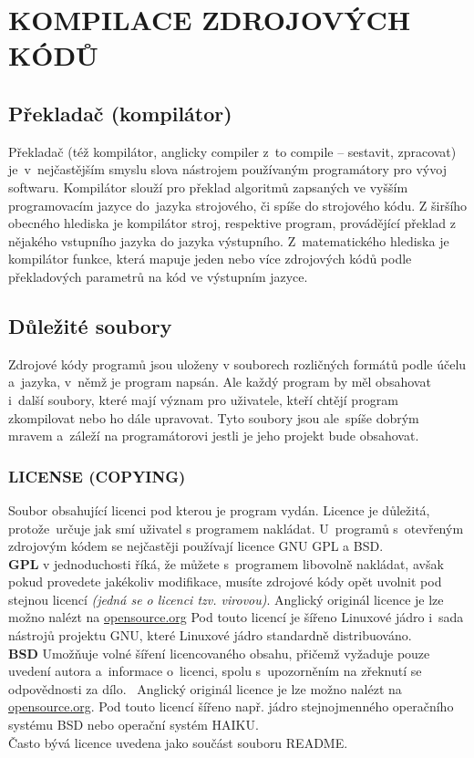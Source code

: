 \documentclass[a4paper,12pt]{article}
\newcommand{\upc}[1]{\uppercase{#1}} %
\renewcommand{\b}[1]{\textbf{#1}} %
\renewcommand{\it}[1]{\textit{#1}}		%
\begin{document}
\section{\upc{Kompilace zdrojových kódů}}
\subsection{Překladač (kompilátor)}
Překladač (též kompilátor, anglicky compiler z~to compile – sestavit, zpracovat) je~v~nejčastějším smyslu slova nástrojem používaným programátory pro vývoj softwaru. Kompilátor slouží pro překlad algoritmů zapsaných ve vyšším programovacím jazyce do~jazyka strojového, či spíše do strojového kódu. Z širšího obecného hlediska je kompilátor stroj, respektive program, provádějící překlad z nějakého vstupního jazyka do jazyka výstupního. Z~matematického hlediska je kompilátor funkce, která mapuje jeden nebo více zdrojových kódů podle překladových parametrů na kód ve výstupním jazyce.~\cite{Wkom}
\subsection{Důležité soubory}
Zdrojové kódy programů jsou uloženy v souborech rozličných formátů podle účelu a~jazyka, v~němž je program napsán. Ale každý program by měl obsahovat i~další soubory, které mají význam pro uživatele, kteří chtějí program zkompilovat nebo ho dále upravovat. Tyto soubory jsou ale~spíše dobrým mravem a~záleží na programátorovi jestli je jeho projekt bude obsahovat.
\subsubsection{LICENSE (COPYING)}
Soubor obsahující licenci pod kterou je program vydán. Licence je důležitá, protože~určuje jak smí uživatel s programem nakládat. U~programů s~otevřeným zdrojovým kódem se nejčastěji používají licence GNU GPL a BSD.\\ \b{GPL} v jednoduchosti říká, že můžete s~programem libovolně nakládat, avšak pokud provedete jakékoliv modifikace, musíte zdrojové kódy opět uvolnit pod stejnou licencí \it{(jedná se o licenci tzv. virovou)}. Anglický originál licence je lze možno nalézt na \href{http://www.opensource.org/licenses/gpl-3.0}{opensource.org} Pod touto licencí je šířeno Linuxové jádro i~sada nástrojů projektu GNU, které Linuxové jádro standardně distribuováno.\\ \b{BSD} Umožňuje volné šíření licencovaného obsahu, přičemž vyžaduje pouze uvedení autora a~informace o~licenci, spolu s~upozorněním na zřeknutí se odpovědnosti za dílo.~\cite{BSDL} Anglický originál licence je lze možno nalézt na \href{http://www.opensource.org/licenses/bsd-license.php}{opensource.org}. Pod touto licencí šířeno např. jádro stejnojmenného operačního systému BSD nebo operační systém HAIKU.\\
Často bývá licence uvedena jako součást souboru README.
\end{document}
